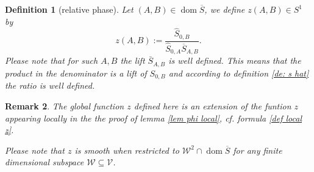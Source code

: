 \documentclass[b5paper,draft,openbib,12pt]{memoir}
\newtheorem{Def}{Definition}
\newtheorem{Remark}[Def]{Remark}
\DeclareMathOperator{\dom}{dom}
\begin{document}




\begin{Def}[relative phase]\label{def relative phase}
Let \((A,B) \in\dom\overline{S}\), we define \(z(A,B)\in S^1\) by
\begin{equation}\label{def z}
z(A,B):=\frac{\hat{S}_{0,B}}{\hat{S}_{0,A}\overline{S}_{A,B}}.
\end{equation}
Please note that for such \(A,B\) the lift \(\bar{S}_{A,B}\) 
is well defined. This means that the product in the 
denominator is a lift of \(S_{0,B}\)
and according to definition \ref{de: s hat} the 
ratio is well defined. 
\end{Def}

\begin{Remark}
The global function \(z\) defined here is an extension 
of the funtion \(z\) appearing locally 
in the 
the proof of lemma \ref{lem phi local},
cf. formula \eqref{def local z}.

Please note that \(z\) is smooth
when restricted to  \(\mathcal{W}^2\cap \dom\overline{S}\) 
for any finite dimensional subspace
 \(\mathcal{W}\subseteq \mathcal{V}\).
\end{Remark}
\end{document}
